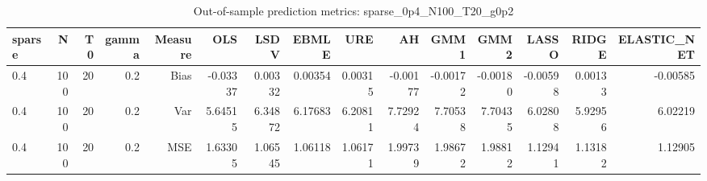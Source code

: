 \begin{table}[!htbp]\centering
\caption{Out-of-sample prediction metrics: sparse_0p4_N100_T20_g0p2}
\label{tab:table3_sparse_0p4_N100_T20_g0p2}
\begin{tabular}{lrrrrrrrrrrrrrr}
\hline
sparse & N & T0 & gamma & Measure & OLS & LSDV & EBMLE & URE & AH & GMM1 & GMM2 & LASSO & RIDGE & ELASTIC_NET \\
\hline
0.4 & 100 & 20 & 0.2 & Bias & -0.03337 & 0.00332 & 0.00354 & 0.00315 & -0.00177 & -0.00172 & -0.00180 & -0.00598 & 0.00133 & -0.00585 \\
0.4 & 100 & 20 & 0.2 & Var & 5.64515 & 6.34872 & 6.17683 & 6.20811 & 7.72924 & 7.70538 & 7.70435 & 6.02808 & 5.92956 & 6.02219 \\
0.4 & 100 & 20 & 0.2 & MSE & 1.63305 & 1.06545 & 1.06118 & 1.06171 & 1.99739 & 1.98672 & 1.98812 & 1.12941 & 1.13182 & 1.12905 \\
\hline
\end{tabular}
\end{table}

